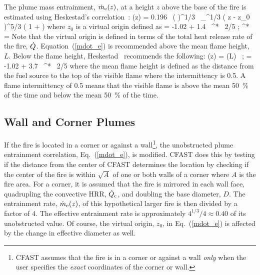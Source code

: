 \documentclass[12pt,twoside]{book}
\begin{document}
The plume mass entrainment, $\dot{m}\sb{\mathrm{e}}(z)$, at a height $z$ above the base of the fire is estimated using Heskestad's correlation~\cite{Heskestad:2002}:
\be
   \dme(z) = 0.196 \, \left(  \right)^{1/3} \, \dQ_{}^{1/3} \; \left( z - z_0 \right)^{5/3} \;
   \left( 1 +  \right) \label{mdot_e}
\ee
where $z_0$ is a virtual origin defined as
\be
    = -1.02 + 1.4 \, \dQ^{* \, 2/5} \quad ; \quad \dQ^* =  \label{virtual_origin}
\ee
Note that the virtual origin is defined in terms of the total heat release rate of the fire, $\dot{Q}$. Equation~(\ref{mdot_e}) is recommended above the mean flame height, $L$. Below the flame height, Heskestad~\cite{Heskestad:2002} recommends the following:
\be
  \dme(z) = \dme(L) \,  \quad ; \quad {} = -1.02 + 3.7 \, \dQ^{* \, 2/5} \label{flame_height}
\ee
where the mean flame height is defined as the distance from the fuel source to the top of the visible flame where the intermittency is 0.5.  A flame intermittency of 0.5 means that the visible flame is above the mean 50~\% of the time and below the mean 50~\% of the time.

\subsection{Wall and Corner Plumes}

If the fire is located in a corner or against a wall\footnote{CFAST assumes that the fire is in a corner or against a wall \emph{only} when the user specifies the \emph{exact} coordinates of the corner or wall.}, the unobstructed plume entrainment correlation, Eq.~(\ref{mdot_e}), is modified. CFAST does this by testing if the distance from the center of CFAST determines the location by checking if the center of the fire is within $\sqrt{A}$ of one or both walls of a corner where $A$ is the fire area. For a corner, it is assumed that the fire is mirrored in each wall face, quadrupling the convective HRR, $\dot{Q}_{\mathrm{c}}$, and doubling the base diameter, $D$. The entrainment rate, $\dot{m}\sb{\mathrm{e}}(z)$, of this hypothetical larger fire is then divided by a factor of 4. The effective entrainment rate is approximately $4^{1/3}/4 \approx 0.40$ of its unobstructed value. Of course, the virtual origin, $z_0$, in Eq.~(\ref{mdot_e}) is affected by the change in effective diameter as well.
\end{document}
